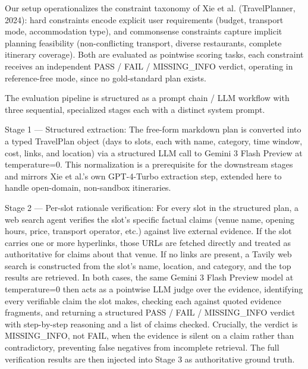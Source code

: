 \documentclass[a4paper,oneside,bibliography=totoc]{scrbook}
\begin{document}
Our setup operationalizes the constraint taxonomy of Xie et al. (TravelPlanner, 2024): hard constraints encode explicit user requirements (budget, transport mode, accommodation type), and commonsense constraints capture implicit planning feasibility (non-conflicting transport, diverse restaurants, complete itinerary coverage). Both are evaluated as pointwise scoring tasks, each constraint receives an independent PASS / FAIL / MISSING_INFO verdict, operating in reference-free mode, since no gold-standard plan exists.

The evaluation pipeline is structured as a prompt chain / LLM workflow with three sequential, specialized stages each with a distinct system prompt.

Stage 1 — Structured extraction: The free-form markdown plan is converted into a typed TravelPlan object (days to slots, each with name, category, time window, cost, links, and location) via a structured LLM call to Gemini 3 Flash Preview at temperature=0. This normalization is a prerequisite for the downstream stages and mirrors Xie et al.'s own GPT-4-Turbo extraction step, extended here to handle open-domain, non-sandbox itineraries.

Stage 2 — Per-slot rationale verification: For every slot in the structured plan, a web search agent verifies the slot's specific factual claims (venue name, opening hours, price, transport operator, etc.) against live external evidence. If the slot carries one or more hyperlinks, those URLs are fetched directly and treated as authoritative for claims about that venue. If no links are present, a Tavily web search is constructed from the slot's name, location, and category, and the top results are retrieved. In both cases, the same Gemini 3 Flash Preview model at temperature=0 then acts as a pointwise LLM judge over the evidence, identifying every verifiable claim the slot makes, checking each against quoted evidence fragments, and returning a structured PASS / FAIL / MISSING_INFO verdict with step-by-step reasoning and a list of claims checked. Crucially, the verdict is MISSING_INFO, not FAIL, when the evidence is silent on a claim rather than contradictory, preventing false negatives from incomplete retrieval. The full verification results are then injected into Stage 3 as authoritative ground truth.
\end{document}
